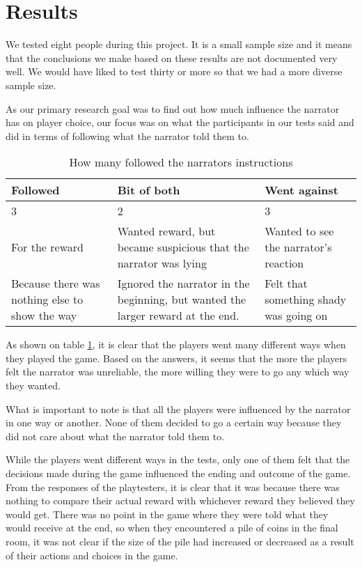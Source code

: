 \section{Results}
\label{Results}
We tested eight people during this project. It is a small sample size and it means that the conclusions we make based on these results are not documented very well. We would have liked to test thirty or more so that we had a more diverse sample size.

As our primary research goal was to find out how much influence the narrator has on player choice, our focus was on what the participants in our tests said and did in terms of following what the narrator told them to.
\begin{table}
\begin{center}
\renewcommand{\arraystretch}{1.3}
\caption {How many followed the narrators instructions}
\label{table-followed_instructions}
\begin{tabular}{ | p{2.3cm} | p{2.3cm} | p{2.3cm} | }
  \hline                       
  \textbf{Followed} & \textbf{Bit of both} & \textbf{Went against} \\
  \hline  
  3 & 2 & 3 \\
  \hline  
  For the reward & Wanted reward, but became suspicious that the narrator was lying & Wanted to see the narrator’s reaction \\
  \hline  
  Because there was nothing else to show the way & Ignored the narrator in the beginning, but wanted the larger reward at the end. & Felt that something shady was going on \\
  \hline  
\end{tabular}
\end{center}
\end{table}

As shown on table \ref{table-followed_instructions}, it is clear that the players went many different ways when they played the game. Based on the answers, it seems that the more the players felt the narrator was unreliable, the more willing they were to go any which way they wanted.

What is important to note is that all the players were influenced by the narrator in one way or another. None of them decided to go a certain way because they did not care about what the narrator told them to. 

While the players went different ways in the tests, only one of them felt that the decisions made during the game influenced the ending and outcome of the game. From the responses of the playtesters, it is clear that it was because there was nothing to compare their actual reward with whichever reward they believed they would get. There was no point in the game where they were told what they would receive at the end, so when they encountered a pile of coins in the final room, it was not clear if the size of the pile had increased or decreased as a result of their actions and choices in the game.


